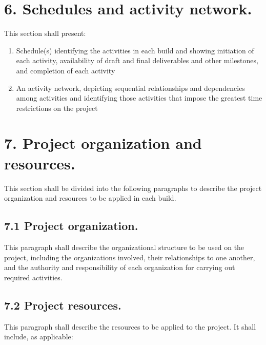 \section{6. Schedules and activity network.}

This section shall present:

\begin{enumerate}
\itemsep1pt\parskip0pt
\item
  Schedule(s) identifying the activities in each build and showing
  initiation of each activity, availability of draft and final
  deliverables and other milestones, and completion of each activity
\item
  An activity network, depicting sequential relationships and
  dependencies among activities and identifying those activities that
  impose the greatest time restrictions on the project
\end{enumerate}

\section{7. Project organization and resources.}

This section shall be divided into the following paragraphs to describe
the project organization and resources to be applied in each build.

\subsection{7.1 Project organization.}

This paragraph shall describe the organizational structure to be used on
the project, including the organizations involved, their relationships
to one another, and the authority and responsibility of each
organization for carrying out required activities.

\subsection{7.2 Project resources.}

This paragraph shall describe the resources to be applied to the
project. It shall include, as applicable:

